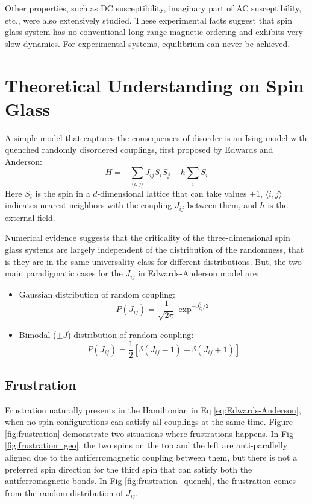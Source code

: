 Other properties, such as DC susceptibility\citep{PhysRevB.19.1633,doi:10.1143/JPSJ.62.4488}, 
imaginary part of AC susceptibility\citep{PhysRevB.25.515,:/content/aip/journal/jap/53/3/10.1063/1.330780}, etc.,
were also extensively studied. 
These experimental facts suggest that spin glass system has no conventional 
long range magnetic ordering and exhibits very slow dynamics. For experimental 
systems, equilibrium can never be achieved. 



\section{Theoretical Understanding on Spin Glass}
A simple model that captures the consequences of disorder is an Ising model 
with quenched randomly disordered couplings, first proposed by Edwards and 
Anderson\cite{Edwards-Anderson1975}:
\begin{equation}
  \label{eq:Edwards-Anderson}
  H=-\sum_{\langle i,j \rangle}J_{ij}S_iS_j-h\sum_iS_i
\end{equation}
Here $S_i$ is the spin in a $d$-dimensional lattice that can take values $\pm 1$,
$\langle i,j \rangle$ indicates nearest neighbors with the coupling $J_{ij}$ between 
them, and $h$ is the external field.
 
Numerical evidence suggests that the criticality of the three-dimensional
spin glass systems are largely independent of the distribution of the randomness,
that is they are in the same universality class for different distributions. 
But, the two main paradigmatic cases for the $J_{ij}$ in Edwards-Anderson model are:
\begin{itemize}
\item Gaussian distribution of random coupling:
  \begin{equation}
    \label{eq:Jij_Gaussian}
    P(J_{ij})=\frac{1}{\sqrt{2\pi}}\exp^{-J_{ij}^2/2}
  \end{equation}
\item Bimodal ($\pm J$) distribution of random coupling:
  \begin{equation}
    \label{eq:Jij_bimodal}
    P(J_{ij})=\frac{1}{2}[\delta(J_{ij}-1)+\delta(J_{ij}+1)]
  \end{equation}
\end{itemize}

\subsection{Frustration}
\label{sec:frustration}
Frustration naturally presents in the Hamiltonian in Eq \ref{eq:Edwards-Anderson}, when no spin 
configurations can satisfy all couplings at the same time. 
Figure \ref{fig:frustration} demonstrate two situations where frustrations 
happens. In Fig \ref{fig:frustration_geo}, the two spins on the top and the left
are anti-parallelly aligned due to the antiferromagnetic coupling between them,
but there is not a preferred spin direction for the third spin that can satisfy
both the antiferromagnetic bonds. In Fig \ref{fig:frustration_quench}, the 
frustration comes from the random distribution of $J_{ij}$. 

